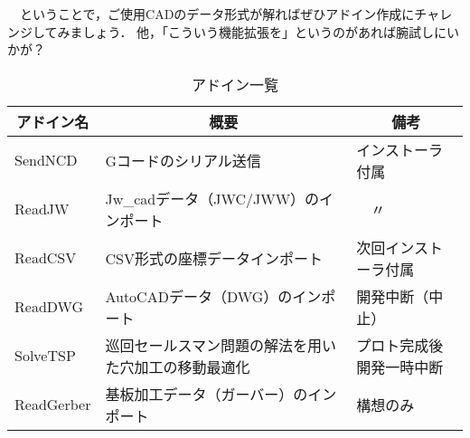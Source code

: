 　ということで，ご使用CADのデータ形式が解ればぜひアドイン作成にチャレンジしてみましょう．
他，「こういう機能拡張を」というのがあれば腕試しにいかが？

\begin{table}[H]
\caption{アドイン一覧}
\label{table:addin}
\centering
\begin{tabular}{|l|l|l|}
\hline
\multicolumn{1}{|c|}{アドイン名} & \multicolumn{1}{c|}{概要} & \multicolumn{1}{c|}{備考} \\ \hline \hline
SendNCD    & Gコードのシリアル送信 & インストーラ付属 \\ \hline
ReadJW     & Jw\_cadデータ（JWC/JWW）のインポート & 　〃 \\ \hline
ReadCSV    & CSV形式の座標データインポート & 次回インストーラ付属 \\ \hline \hline
ReadDWG    & AutoCADデータ（DWG）のインポート & 開発中断（中止） \\ \hline
SolveTSP   & 巡回セールスマン問題の解法を用いた穴加工の移動最適化 & プロト完成後開発一時中断 \\ \hline
ReadGerber & 基板加工データ（ガーバー）のインポート & 構想のみ \\ \hline
\end{tabular}
\end{table}
